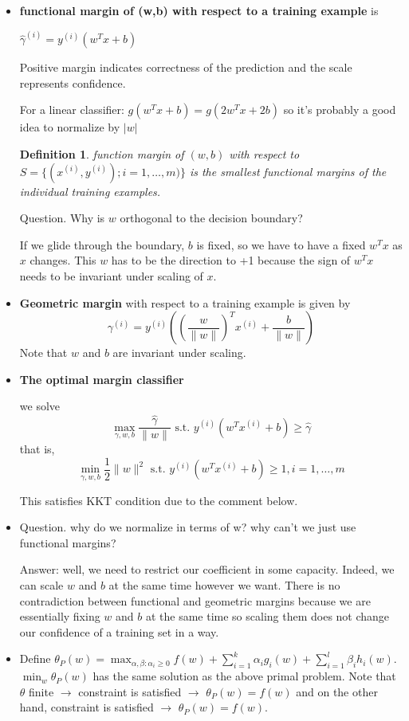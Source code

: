 \documentclass{article}
\newtheorem{definition}{Definition}
\theoremstyle{remark}
\begin{document}
\begin{itemize}
    \item \textbf{functional margin of (w,b) with respect to a training example} is

    $\hat\gamma^{(i)}=y^{(i)}(w^T x+b)$

Positive margin indicates correctness of the prediction and the scale represents confidence.

    For a linear classifier: $g(w^T x+b)=g(2w^T x+2b)$ so it's probably a good idea to normalize by $\lvert w\rvert$

    \begin{definition}
    function margin of $(w,b)$ with respect to $S=\{(x^{(i)}, y^{(i)});i=1,\dots ,m)\}$ is the smallest functional margins of the individual training examples.
    \end{definition}

    Question. Why is $w$ orthogonal to the decision boundary?

    If we glide through the boundary, $b$ is fixed, so we have to have a fixed $w^T x$ as $x$ changes. This $w$ has to be the direction to +1 because the sign of $w^T x$ needs to be invariant under scaling of $x$.
    \item \textbf{Geometric margin} with respect to a training example is 
 given by $$\gamma^{(i)}=y^{(i)}((\frac w{\lVert w\rVert})^T x^{(i)}+\frac b{\lVert w\rVert})$$
 Note that $w$ and $b$ are invariant under scaling.

\item \textbf{The optimal margin classifier}

we solve $$\max _{\gamma,w,b}\frac{\hat\gamma}{\lVert w\rVert} \text{ s.t. } y^{(i)}(w^T x^{(i)}+b)\geq \hat\gamma$$
that is, 
$$\min_{\gamma,w,b}\frac1 2\lVert w\rVert ^2\text{ s.t. } y^{(i)}(w^T x^{(i)}+b)\geq 1, i=1,\dots, m$$

This satisfies KKT condition due to the comment below.

\item Question. why do we normalize in terms of w? why can't we just use functional margins?

Answer: well, we need to restrict our coefficient in some capacity.
 Indeed, we can scale $w$ and $b$ at the same time however we want. There is no contradiction between functional and geometric margins because we are essentially fixing $w$ and $b$ at the same time so scaling them does not change our confidence of a training set in a way.

 \item Define $\theta_P (w)=\max_{\alpha, \beta:\alpha_i\geq 0} f(w)+\sum^k_{i=1}\alpha_ig_i (w)+\sum^l_{i=1}\beta_i h_i (w)$. $\min_w \theta_P (w)$ has the same solution as the above primal problem. Note that $\theta$ finite $\to$ constraint is satisfied $\to$ $\theta_P (w)=f(w)$ and on the other hand, constraint is satisfied $\to$ $\theta_P (w)=f(w)$.


\end{itemize}
\end{document}
